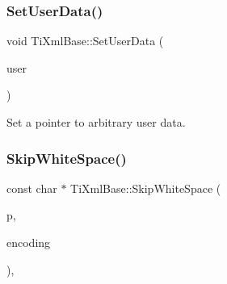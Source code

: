 \subsubsection{\texorpdfstring{Set\+User\+Data()}{SetUserData()}}
{\footnotesize\ttfamily void Ti\+Xml\+Base\+::\+Set\+User\+Data (\begin{DoxyParamCaption}\item[{void $\ast$}]{user }\end{DoxyParamCaption})\hspace{0.3cm}{\ttfamily [inline]}}



Set a pointer to arbitrary user data. 

\mbox{\label{class_ti_xml_base_ac0c3d66d8a9e6996a1fa016275e16875}} 
\subsubsection{\texorpdfstring{Skip\+White\+Space()}{SkipWhiteSpace()}}
{\footnotesize\ttfamily const char $\ast$ Ti\+Xml\+Base\+::\+Skip\+White\+Space (\begin{DoxyParamCaption}\item[{const char $\ast$}]{p,  }\item[{\hyperlink{tinyxml_8h_a88d51847a13ee0f4b4d320d03d2c4d96}{Ti\+Xml\+Encoding}}]{encoding }\end{DoxyParamCaption})\hspace{0.3cm}{\ttfamily [static]}, {\ttfamily [protected]}}

